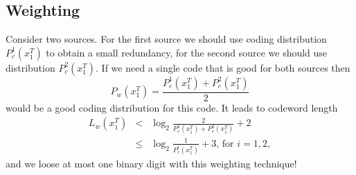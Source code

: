 \documentclass[10pt,conference]{IEEEtran}
\newcommand{\xT}{x^{T}_{1}}
\begin{document}
\subsection{Weighting}
Consider two sources.
For the first source we should use coding distribution $P^{1}_c(\xT)$ to obtain a small redundancy, for the second source we should use distribution $P^{2}_c(\xT)$.
If we need a single code that is good for both sources then
\begin{equation}
P_{w}(\xT) = \frac{P^{1}_c(\xT)+ P^{2}_c(\xT)}{2}
\end{equation}
would be a good coding distribution for this code.
It leads to codeword length
\begin{eqnarray}
L_{w}(\xT)
&<& \log_2 \frac{2}{ P^{1}_c(\xT) + P^{2}_c(\xT) } +2 \nonumber \\
&\leq & \log_2 \frac{1}{ P^{i}_c(\xT) }+ 3 \mbox{, for $i=1,2$},
\end{eqnarray}
and we loose at most one binary digit with this weighting technique!

\end{document}
